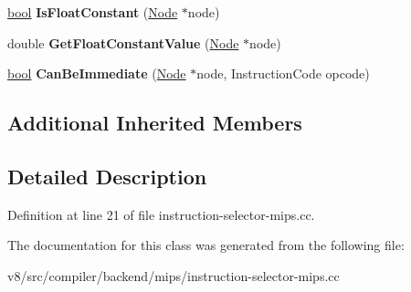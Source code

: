 \begin{DoxyCompactItemize}
\mbox{\hyperlink{classbool}{bool}} {\bfseries Is\+Float\+Constant} (\mbox{\hyperlink{classv8_1_1internal_1_1compiler_1_1Node}{Node}} $\ast$node)
\item 
\mbox{\label{classv8_1_1internal_1_1compiler_1_1MipsOperandGenerator_ac2600262f592ca5b301116bcfedb03a3}} 
double {\bfseries Get\+Float\+Constant\+Value} (\mbox{\hyperlink{classv8_1_1internal_1_1compiler_1_1Node}{Node}} $\ast$node)
\item 
\mbox{\label{classv8_1_1internal_1_1compiler_1_1MipsOperandGenerator_a811678cbfc72fb95663519c85e6142c3}} 
\mbox{\hyperlink{classbool}{bool}} {\bfseries Can\+Be\+Immediate} (\mbox{\hyperlink{classv8_1_1internal_1_1compiler_1_1Node}{Node}} $\ast$node, Instruction\+Code opcode)
\end{DoxyCompactItemize}
\subsection*{Additional Inherited Members}


\subsection{Detailed Description}


Definition at line 21 of file instruction-\/selector-\/mips.\+cc.



The documentation for this class was generated from the following file\+:\begin{DoxyCompactItemize}
\item 
v8/src/compiler/backend/mips/instruction-\/selector-\/mips.\+cc\end{DoxyCompactItemize}
